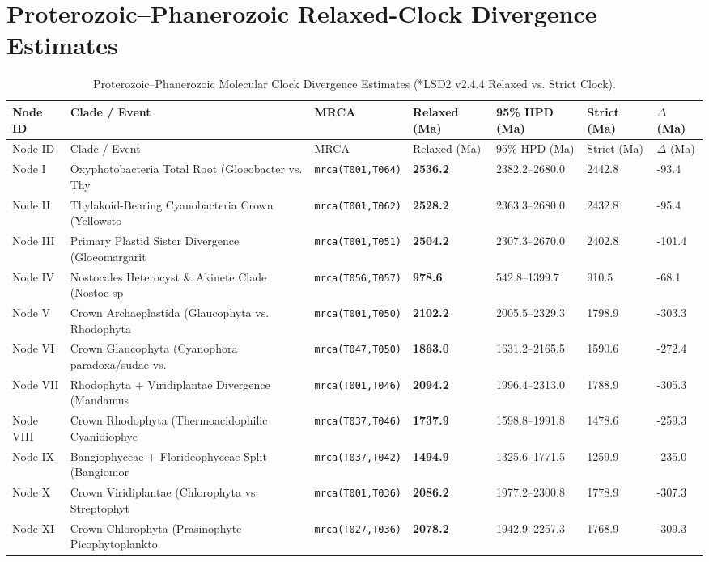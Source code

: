\documentclass[10pt,letterpaper]{article}
\begin{document}
\section{Proterozoic--Phanerozoic Relaxed-Clock Divergence Estimates}
\begin{longtable}{lllllll}
\caption{Proterozoic--Phanerozoic Molecular Clock Divergence Estimates (*LSD2 v2.4.4 Relaxed vs. Strict Clock).} \\
\toprule
Node ID & Clade / Event & MRCA & Relaxed (Ma) & 95\% HPD (Ma) & Strict (Ma) & $\Delta$ (Ma) \\
\midrule
\endfirsthead
\toprule
Node ID & Clade / Event & MRCA & Relaxed (Ma) & 95\% HPD (Ma) & Strict (Ma) & $\Delta$ (Ma) \\
\midrule
\endhead
Node I & Oxyphotobacteria Total Root (Gloeobacter vs. Thy & \texttt{mrca(T001,T064)} & \textbf{2536.2} & 2382.2--2680.0 & 2442.8 & -93.4 \\
Node II & Thylakoid-Bearing Cyanobacteria Crown (Yellowsto & \texttt{mrca(T001,T062)} & \textbf{2528.2} & 2363.3--2680.0 & 2432.8 & -95.4 \\
Node III & Primary Plastid Sister Divergence (Gloeomargarit & \texttt{mrca(T001,T051)} & \textbf{2504.2} & 2307.3--2670.0 & 2402.8 & -101.4 \\
Node IV & Nostocales Heterocyst \& Akinete Clade (Nostoc sp & \texttt{mrca(T056,T057)} & \textbf{978.6} & 542.8--1399.7 & 910.5 & -68.1 \\
Node V & Crown Archaeplastida (Glaucophyta vs. Rhodophyta & \texttt{mrca(T001,T050)} & \textbf{2102.2} & 2005.5--2329.3 & 1798.9 & -303.3 \\
Node VI & Crown Glaucophyta (Cyanophora paradoxa/sudae vs. & \texttt{mrca(T047,T050)} & \textbf{1863.0} & 1631.2--2165.5 & 1590.6 & -272.4 \\
Node VII & Rhodophyta + Viridiplantae Divergence (Mandamus  & \texttt{mrca(T001,T046)} & \textbf{2094.2} & 1996.4--2313.0 & 1788.9 & -305.3 \\
Node VIII & Crown Rhodophyta (Thermoacidophilic Cyanidiophyc & \texttt{mrca(T037,T046)} & \textbf{1737.9} & 1598.8--1991.8 & 1478.6 & -259.3 \\
Node IX & Bangiophyceae + Florideophyceae Split (Bangiomor & \texttt{mrca(T037,T042)} & \textbf{1494.9} & 1325.6--1771.5 & 1259.9 & -235.0 \\
Node X & Crown Viridiplantae (Chlorophyta vs. Streptophyt & \texttt{mrca(T001,T036)} & \textbf{2086.2} & 1977.2--2300.8 & 1778.9 & -307.3 \\
Node XI & Crown Chlorophyta (Prasinophyte Picophytoplankto & \texttt{mrca(T027,T036)} & \textbf{2078.2} & 1942.9--2257.3 & 1768.9 & -309.3 \\

\end{longtable}
\end{document}
